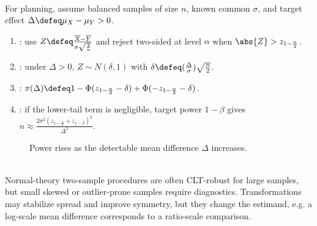 \begin{method} \label{meth:two-sample-normal-power-balanced} \\
For planning, assume balanced samples of size $n$, known common $\sigma$, and target effect $\Delta\defeq\mu_X-\mu_Y>0$.
\begin{enumerate}[label=(\roman*)]
\setlength{\itemsep}{0pt}
\item {}: use $Z\defeq\frac{\overline{X}-\overline{Y}}{\sigma\sqrt{\frac{2}{n}}}$ and reject two-sided at level $\alpha$ when $\abs{Z}>z_{1-\frac{\alpha}{2}}$.
\item {}: under $\Delta>0$, $Z\sim N(\delta,1)$ with $\delta\defeq(\frac{\Delta}{\sigma})\sqrt{\frac{n}{2}}$.
\item {}: $\pi(\Delta)\defeq1-\Phi(z_{1-\frac{\alpha}{2}}-\delta)+\Phi(-z_{1-\frac{\alpha}{2}}-\delta)$.
\item {}: if the lower-tail term is negligible, target power $1-\beta$ gives $n\approx\frac{2\sigma^2(z_{1-\frac{\alpha}{2}}+z_{1-\beta})^2}{\Delta^2}$.
\end{enumerate}
\end{method}

\begin{figure}[H]
  \centering
  
  \caption{Power rises as the detectable mean difference $\Delta$ increases.}
  \label{fig:two-sample-power-curve}
\end{figure}

\begin{remark} \label{rem:two-sample-transformations-and-diagnostics} \\
Normal-theory two-sample procedures are often CLT-robust for large samples, but small skewed or outlier-prone samples require diagnostics. Transformations may stabilize spread and improve symmetry, but they change the estimand, e.g. a log-scale mean difference corresponds to a ratio-scale comparison.
\end{remark}
